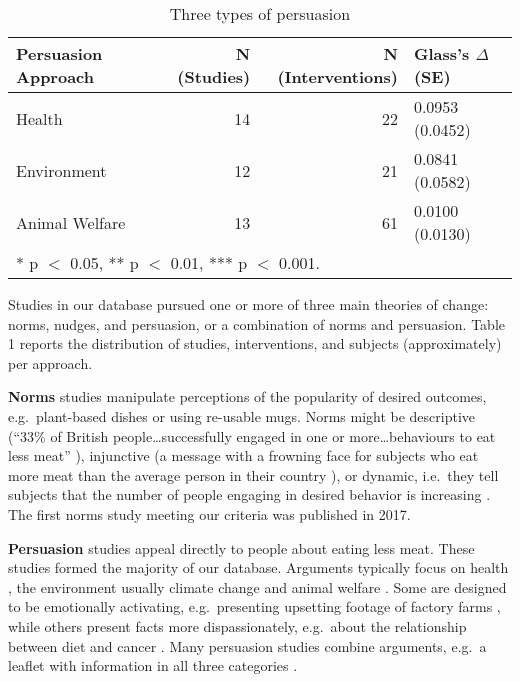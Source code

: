 \documentclass[sn-nature,pdflatex]{sn-jnl}
\begin{document}
\begin{table}[!h]
\centering
\caption{\label{tab:tab:table_two}Three types of persuasion}
\centering
\begin{tabular}[t]{lrrl}
\toprule
Persuasion Approach & N (Studies) & N (Interventions) & Glass's $\Delta$ (SE)\\
\midrule
Health & 14 & 22 & 0.0953 (0.0452)\\
Environment & 12 & 21 & 0.0841 (0.0582)\\
Animal Welfare & 13 & 61 & 0.0100 (0.0130)\\
\bottomrule
\multicolumn{4}{l}{\rule{0pt}{1em}* p $<$ 0.05, ** p $<$ 0.01, *** p $<$ 0.001.}\\
\end{tabular}
\end{table}

Studies in our database pursued one or more of three main theories of
change: norms, nudges, and persuasion, or a combination of norms and
persuasion. Table 1 reports the distribution of studies, interventions,
and subjects (approximately) per approach.

\textbf{Norms} studies manipulate perceptions of the popularity of
desired outcomes, e.g.~plant-based dishes \citep{sparkman2021} or using
re-usable mugs\citep{loschelder2019}. Norms might be descriptive (``33\%
of British people\ldots successfully engaged in one or
more\ldots behaviours to eat less meat'' \citep{aldoh2023}), injunctive
(a message with a frowning face for subjects who eat more meat than the
average person in their country \citep{alblas2023}), or dynamic,
i.e.~they tell subjects that the number of people engaging in desired
behavior is increasing
\citep{aldoh2023, coker2022, sparkman2017, sparkman2020, sparkman2021}.
The first norms study meeting our criteria was published in 2017.

\textbf{Persuasion} studies appeal directly to people about eating less
meat. These studies formed the majority of our database. Arguments
typically focus on health \citep{lacroix2020}, the environment
\citep{carfora2023} \textemdash usually climate change \textemdash and
animal welfare \citep{haile2021}. Some are designed to be emotionally
activating, e.g.~presenting upsetting footage of factory farms
\citep{bertolaso2015}, while others present facts more dispassionately,
e.g.~about the relationship between diet and cancer \citep{hatami2018}.
Many persuasion studies combine arguments, e.g.~a leaflet with
information in all three categories \citep{hennessy2016}.
\end{document}
